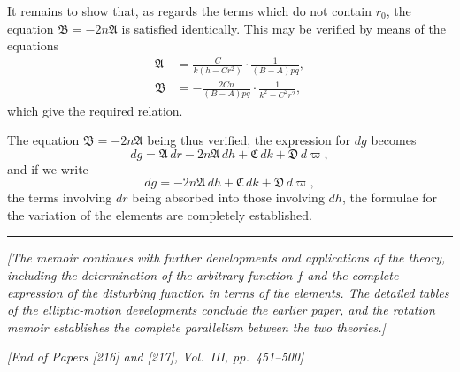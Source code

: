\documentclass[11pt,a4paper]{article}
\theoremstyle{plain}
\theoremstyle{definition}
\theoremstyle{remark}
\begin{document}
It remains to show that, as regards the terms which do not contain $r_0$, the equation $\mathfrak{B} = -2n\mathfrak{A}$ is satisfied identically. This may be verified by means of the equations
\begin{align*}
\mathfrak{A} &= \frac{C}{k(h-Cr^2)} \cdot \frac{1}{(B-A)pq}, \\
\mathfrak{B} &= -\frac{2Cn}{(B-A)pq} \cdot \frac{1}{k^2-C^2r^2},
\end{align*}
which give the required relation.

The equation $\mathfrak{B} = -2n\mathfrak{A}$ being thus verified, the expression for $dg$ becomes
\[
dg = \mathfrak{A} \, dr - 2n\mathfrak{A} \, dh + \mathfrak{C} \, dk + \mathfrak{D} \, d\varpi,
\]
and if we write
\[
dg = -2n\mathfrak{A} \, dh + \mathfrak{C} \, dk + \mathfrak{D} \, d\varpi,
\]
the terms involving $dr$ being absorbed into those involving $dh$, the formulae for the variation of the elements are completely established.

\vspace{2em}

\begin{center}
\rule{0.5\textwidth}{0.4pt}
\end{center}

\vspace{1em}

\noindent\textit{[The memoir continues with further developments and applications of the theory, including the determination of the arbitrary function $f$ and the complete expression of the disturbing function in terms of the elements. The detailed tables of the elliptic-motion developments conclude the earlier paper, and the rotation memoir establishes the complete parallelism between the two theories.]}

\vspace{2em}

\begin{flushright}
\textit{[End of Papers [216] and [217], Vol.~III, pp.~451--500]}
\end{flushright}
\end{document}
